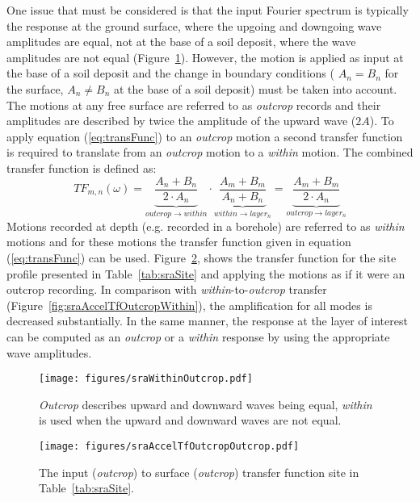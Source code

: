 \documentclass[11pt]{report}
\begin{document}
One issue that must be considered is that the input Fourier spectrum is typically the response at
the ground surface, where the upgoing and downgoing wave amplitudes are equal, not at the base of a
soil deposit, where the wave amplitudes are not equal (Figure~\ref{fig:sraOutcropWithin}). However,
the motion is applied as input at the base of a soil deposit and the change in boundary conditions (
$A_n = B_n$ for the surface, $A_n \ne B_n$ at the base of a soil deposit) must be taken into
account.  The motions at any free surface are referred to as \emph{outcrop} records and their amplitudes are described by twice the amplitude of the upward wave
($2A$).  To apply equation (\ref{eq:transFunc}) to an \emph{outcrop} motion a second transfer
function is required to translate from an \emph{outcrop} motion to a \emph{within} motion.  The
combined transfer function is defined as:
\begin{equation}
  TF_{m,n}(\omega) = \underbrace{\frac{A_n + B_n}{2\cdot A_n}}_{outcrop \to within} \cdot
  \underbrace{\frac{A_m + B_m}{A_n + B_n}}_{within \to layer_n} = \underbrace{\frac{A_m + B_m}{ 2
  \cdot A_n }}_{outcrop \to layer_n}
\end{equation}
Motions recorded at depth (e.g. recorded in a borehole) are referred to as
\emph{within} motions and for these motions the transfer function given in
equation (\ref{eq:transFunc}) can be used.  Figure~\ref{fig:sraAccelTfOutcropOutcrop}, shows the
transfer function for the site profile presented in Table~\ref{tab:sraSite} and applying the motions
as if it were an outcrop recording.  In comparison with \emph{within}-to-\emph{outcrop} transfer
(Figure~\ref{fig:sraAccelTfOutcropWithin}), the amplification for all modes is decreased
substantially. In the same manner, the response at the layer of interest can be computed as an
\emph{outcrop} or a \emph{within} response by using the appropriate wave amplitudes.  

\begin{figure}[tb]
  \begin{center}
	\texttt{[image: figures/sraWithinOutcrop.pdf]}
  \end{center}
  \caption{\emph{Outcrop} describes upward and downward waves being equal, \emph{within} is used
  when the upward and downward waves are not equal.}
  \label{fig:sraOutcropWithin}
\end{figure}
\begin{figure}[tb]
  \begin{center}
	\texttt{[image: figures/sraAccelTfOutcropOutcrop.pdf]}
  \end{center}
  \caption{The input (\emph{outcrop}) to surface (\emph{outcrop}) transfer function site in
  Table~\ref{tab:sraSite}.}
  \label{fig:sraAccelTfOutcropOutcrop}
\end{figure}
\clearpage
\end{document}
